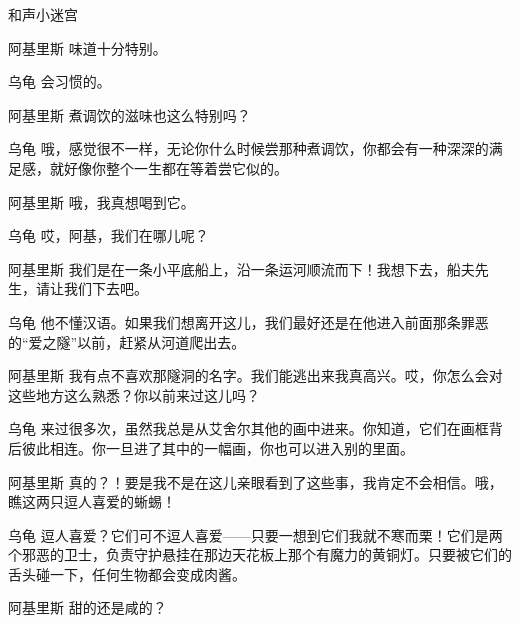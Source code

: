 \begin{dialog}{和声小迷宫}
\begin{dialogue}
\begin{dialogue}

    \begin{dialogue}

    \item[阿基里斯]味道十分特别。

    \item[乌龟]会习惯的。

    \item[阿基里斯]煮调饮的滋味也这么特别吗？

    \item[乌龟]哦，感觉很不一样，无论你什么时候尝那种煮调饮，你都会有一种深深的满足感，就好像你整个一生都在等着尝它似的。

    \item[阿基里斯]哦，我真想喝到它。

    \item[乌龟]哎，阿基，我们在哪儿呢？

    \item[阿基里斯\dlnote{（环顾四周）}]我们是在一条小平底船上，沿一条运河顺流而下！我想下去，船夫先生，请让我们下去吧。


    \item[乌龟]他不懂汉语。如果我们想离开这儿，我们最好还是在他进入前面那条罪恶的“爱之隧”以前，赶紧从河道爬出去。


    \item[阿基里斯]我有点不喜欢那隧洞的名字。我们能逃出来我真高兴。哎，你怎么会对这些地方这么熟悉？你以前来过这儿吗？

    \item[乌龟]来过很多次，虽然我总是从艾舍尔其他的画中进来。你知道，它们在画框背后彼此相连。你一旦进了其中的一幅画，你也可以进入别的里面。

    \item[阿基里斯]真的？！要是我不是在这儿亲眼看到了这些事，我肯定不会相信。哦，瞧这两只逗人喜爱的蜥蜴！

    \item[乌龟]逗人喜爱？它们可不逗人喜爱——只要一想到它们我就不寒而栗！它们是两个邪恶的卫士，负责守护悬挂在那边天花板上那个有魔力的黄铜灯。只要被它们的舌头碰一下，任何生物都会变成肉酱。

    \item[阿基里斯]甜的还是咸的？


\end{dialogue}
\end{dialogue}
\end{dialogue}
\end{dialog}
